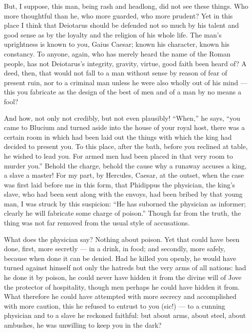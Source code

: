  But, I suppose, this man, being rash and headlong, did not see these things. Who more thoughtful than he, who more guarded, who more prudent? Yet in this place I think that Deiotarus should be defended not so much by his talent and good sense as by the loyalty and the religion of his whole life. The man's uprightness is known to you, Gaius Caesar; known his character, known his constancy. To anyone, again, who has merely heard the name of the Roman people, has not Deiotarus's integrity, gravity, virtue, good faith been heard of? A deed, then, that would not fall to a man without sense by reason of fear of present ruin, nor to a criminal man unless he were also wholly out of his mind --- this you fabricate as the design of the best of men and of a man by no means a fool?

 And how, not only not credibly, but not even plausibly! ``When,'' he says, ``you came to Blucium and turned aside into the house of your royal host, there was a certain room in which had been laid out the things with which the king had decided to present you. To this place, after the bath, before you reclined at table, he wished to lead you. For armed men had been placed in that very room to murder you.'' Behold the charge, behold the cause why a runaway accuses a king, a slave a master! For my part, by Hercules, Caesar, at the outset, when the case was first laid before me in this form, that Phidippus the physician, the king's slave, who had been sent along with the envoys, had been bribed by that young man, I was struck by this suspicion: ``He has suborned the physician as informer; clearly he will fabricate some charge of poison.'' Though far from the truth, the thing was not far removed from the usual style of accusations.

 What does the physician say? Nothing about poison. Yet that could have been done, first, more secretly --- in a drink, in food; and secondly, more safely, because when done it can be denied. Had he killed you openly, he would have turned against himself not only the hatreds but the very arms of all nations: had he done it by poison, he could never have hidden it from the divine will of Jove the protector of hospitality, though men perhaps he could have hidden it from. What therefore he could have attempted with more secrecy and accomplished with more caution, this he refused to entrust to you (sic!) --- to a cunning physician and to a slave he reckoned faithful: but about arms, about steel, about ambushes, he was unwilling to keep you in the dark?

